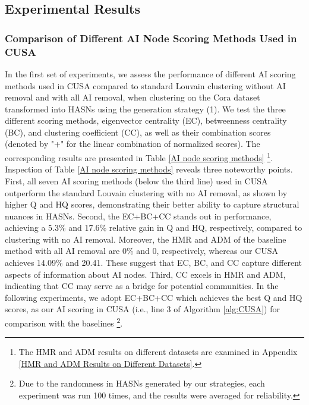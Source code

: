 \subsection{Experimental Results}
\subsubsection{Comparison of Different AI Node Scoring Methods Used in CUSA} In the first set of experiments, we assess the performance of different AI scoring methods used in CUSA compared to standard Louvain clustering \cite{blondel2008fast} without AI removal and with all AI removal, when clustering on the Cora dataset transformed into HASNs using the generation strategy (1). We test the three different scoring methods, eigenvector centrality (EC), betweenness centrality (BC), and clustering coefficient (CC), as well as their combination scores (denoted by "+" for the linear combination of normalized scores). The corresponding results are presented in Table \ref{AI node scoring methods} \footnote{The HMR and ADM results on different datasets are examined in Appendix \ref{HMR and ADM Results on Different Datasets}.}. Inspection of Table \ref{AI node scoring methods} reveals three noteworthy points. First, all seven AI scoring methods (below the third line) used in CUSA outperform the standard Louvain clustering with no AI removal, as shown by higher Q and HQ scores, demonstrating their better ability to capture structural nuances in HASNs. Second, the EC+BC+CC stands out in performance, achieving a 5.3\% and 17.6\% relative gain in Q and HQ, respectively, compared to clustering with no AI removal. Moreover, the HMR and ADM of the baseline method with all AI removal are 0\% and 0, respectively, whereas our CUSA achieves 14.09\% and 20.41. These suggest that EC, BC, and CC capture different aspects of information about AI nodes. Third, CC excels in HMR and ADM, indicating that CC may serve as a bridge for potential communities. In the following experiments, we adopt EC+BC+CC which achieves the best Q and HQ scores, as our AI scoring in CUSA (i.e., line 3 of Algorithm \ref{alg:CUSA}) for comparison with the baselines \footnote{Due to the randomness in HASNs generated by our strategies, each experiment was run 100 times, and the results were averaged for reliability.}.

